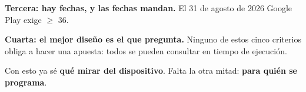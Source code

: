 \textbf{Tercera: hay fechas, y las fechas mandan.} El 31 de agosto de 2026 Google Play exige  $\geq$ 36.

\textbf{Cuarta: el mejor diseño es el que pregunta.} Ninguno de estos cinco criterios obliga a hacer una apuesta: todos se pueden consultar en tiempo de ejecución.

Con esto ya sé \textbf{qué mirar del dispositivo}. Falta la otra mitad: \textbf{para quién se programa}.


